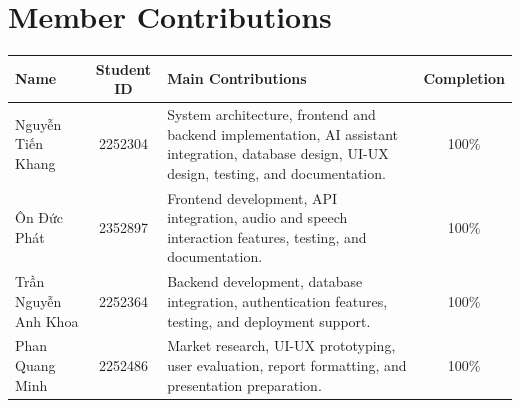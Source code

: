 \chapter*{Member Contributions}
\thispagestyle{plain}

\vspace{0.8cm}

\noindent
\begin{table}[htbp]
\centering
\renewcommand{\arraystretch}{1.5}
\begin{tabularx}{\textwidth}{|p{3.8cm}|c|X|c|}
\hline
\textbf{Name} & \textbf{Student ID} & \textbf{Main Contributions} & \textbf{Completion} \\
\hline
Nguyễn Tiến Khang & 2252304 & System architecture, frontend and backend implementation, AI assistant integration, database design, UI-UX design, testing, and documentation. & 100\% \\
\hline
Ôn Đức Phát & 2352897 & Frontend development, API integration, audio and speech interaction features, testing, and documentation. & 100\% \\
\hline
Trần Nguyễn Anh Khoa & 2252364 & Backend development, database integration, authentication features, testing, and deployment support. & 100\% \\
\hline
Phan Quang Minh & 2252486 & Market research, UI-UX prototyping, user evaluation, report formatting, and presentation preparation. & 100\% \\
\hline
\end{tabularx}
\end{table}

\vfill
\clearpage
